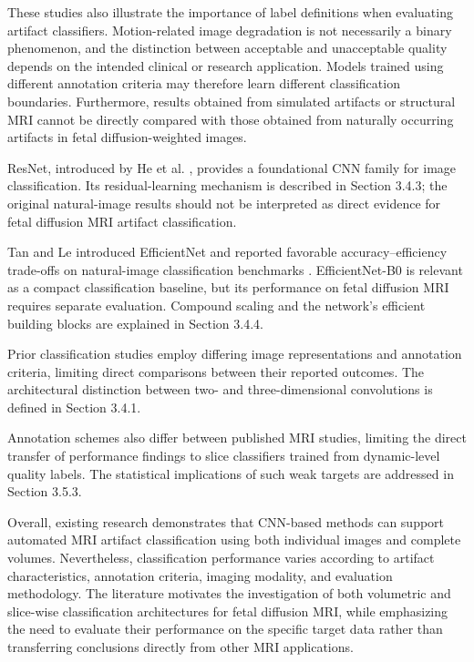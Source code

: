These studies also illustrate the importance of label definitions when evaluating artifact classifiers. Motion-related image degradation is not necessarily a binary phenomenon, and the distinction between acceptable and unacceptable quality depends on the intended clinical or research application. Models trained using different annotation criteria may therefore learn different classification boundaries. Furthermore, results obtained from simulated artifacts or structural MRI cannot be directly compared with those obtained from naturally occurring artifacts in fetal diffusion-weighted images.

ResNet, introduced by He et al. \autocite{he2016resnet}, provides a foundational CNN family for image classification. Its residual-learning mechanism is described in Section 3.4.3; the original natural-image results should not be interpreted as direct evidence for fetal diffusion MRI artifact classification.

Tan and Le introduced EfficientNet and reported favorable accuracy--efficiency trade-offs on natural-image classification benchmarks \autocite{tan2019efficientnet}. EfficientNet-B0 is relevant as a compact classification baseline, but its performance on fetal diffusion MRI requires separate evaluation. Compound scaling and the network's efficient building blocks are explained in Section 3.4.4.

Prior classification studies employ differing image representations and annotation criteria, limiting direct comparisons between their reported outcomes. The architectural distinction between two- and three-dimensional convolutions is defined in Section 3.4.1.

Annotation schemes also differ between published MRI studies, limiting the direct transfer of performance findings to slice classifiers trained from dynamic-level quality labels. The statistical implications of such weak targets are addressed in Section 3.5.3.

Overall, existing research demonstrates that CNN-based methods can support automated MRI artifact classification using both individual images and complete volumes. Nevertheless, classification performance varies according to artifact characteristics, annotation criteria, imaging modality, and evaluation methodology. The literature motivates the investigation of both volumetric and slice-wise classification architectures for fetal diffusion MRI, while emphasizing the need to evaluate their performance on the specific target data rather than transferring conclusions directly from other MRI applications.

